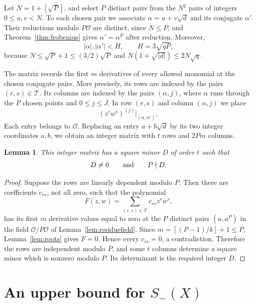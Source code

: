 \documentclass[11pt,twoside,leqno]{article}
\theoremstyle{apostol}
\newtheorem{lemma}[theorem]{Lemma}
\newcommand{\cO}{\mathcal O}
\newcommand{\fl}[1]{\left[#1\right]}
\begin{document}
Let \(N=1+\fl{\sqrt P}\), and select \(P\) distinct pairs from the \(N^2\)
pairs of integers \(0\le u,v<N\). To each chosen pair we associate
\(\alpha=u+v\sqrt d\) and its conjugate \(\alpha'\). Their reductions
modulo \(P\cO\) are distinct, since \(N\le P\), and
Theorem~\ref{thm:frobenius} gives \(\alpha'=\alpha^P\) after reduction.
Moreover,
\[
 |\alpha|,|\alpha'|<H,\qquad H=3\sqrt{qP},
\]
because \(N\le\sqrt P+1\le(3/2)\sqrt P\) and
\(N(1+\sqrt{|d|})\le2N\sqrt q\).

The matrix records the first \(m\) derivatives of every allowed monomial at
the chosen conjugate pairs. More precisely, its rows are indexed by the pairs
\((r,s)\in\mathcal T\). Its columns are indexed by the pairs
\((\alpha,j)\), where \(\alpha\) runs through the \(P\) chosen points and
\(0\le j\le J\). In row \((r,s)\) and column \((\alpha,j)\) we place
\begin{equation}\label{eq:entries}
 (z^rw^s)^{(j)}\big|_{(\alpha,\alpha')},
\end{equation}
Each entry belongs to \(\cO\). Replacing an entry \(a+b\sqrt d\) by its two
integer coordinates \(a,b\), we obtain an integer matrix with \(t\) rows
and \(2Pm\) columns.

\begin{lemma}\label{lem:determinant}
This integer matrix has a square minor \(D\) of order \(t\) such that
\[
 D\ne0\qquad\hbox{and}\qquad P\nmid D.
\]
\end{lemma}

\begin{proof}
Suppose the rows are linearly dependent modulo \(P\). Then there are
coefficients \(c_{rs}\), not all zero, such that the polynomial
\[
 F(z,w)=\sum_{(r,s)\in\mathcal T}c_{rs}z^rw^s,
\]
has its first \(m\) derivative values equal to zero at the \(P\) distinct
pairs \((a,a^P)\) in the field \(\cO/P\cO\) of
Lemma~\ref{lem:residuefield}. Since \(m=\fl{(P-1)/k}+1\le P\),
Lemma~\ref{lem:roots} gives \(F=0\). Hence every \(c_{rs}=0\), a
contradiction. Therefore the rows are independent modulo \(P\), and some
\(t\) columns determine a square minor which is nonzero modulo \(P\). Its
determinant is the required integer \(D\).
\end{proof}

\section{An upper bound for \texorpdfstring{\(S_-(X)\)}{S-(X)}}
\label{sec:arithmetic}
\end{document}
